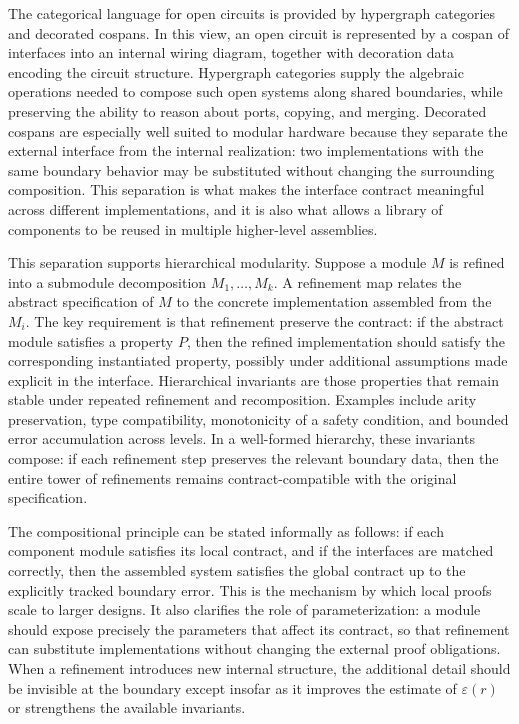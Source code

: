 \documentclass[11pt]{article}
\begin{document}
The categorical language for open circuits is provided by hypergraph categories and decorated cospans. In this view, an open circuit is represented by a cospan of interfaces into an internal wiring diagram, together with decoration data encoding the circuit structure. Hypergraph categories supply the algebraic operations needed to compose such open systems along shared boundaries, while preserving the ability to reason about ports, copying, and merging. Decorated cospans are especially well suited to modular hardware because they separate the external interface from the internal realization: two implementations with the same boundary behavior may be substituted without changing the surrounding composition. This separation is what makes the interface contract meaningful across different implementations, and it is also what allows a library of components to be reused in multiple higher-level assemblies.

This separation supports hierarchical modularity. Suppose a module \(M\) is refined into a submodule decomposition \(M_1,\dots,M_k\). A refinement map relates the abstract specification of \(M\) to the concrete implementation assembled from the \(M_i\). The key requirement is that refinement preserve the contract: if the abstract module satisfies a property \(P\), then the refined implementation should satisfy the corresponding instantiated property, possibly under additional assumptions made explicit in the interface. Hierarchical invariants are those properties that remain stable under repeated refinement and recomposition. Examples include arity preservation, type compatibility, monotonicity of a safety condition, and bounded error accumulation across levels. In a well-formed hierarchy, these invariants compose: if each refinement step preserves the relevant boundary data, then the entire tower of refinements remains contract-compatible with the original specification.

The compositional principle can be stated informally as follows: if each component module satisfies its local contract, and if the interfaces are matched correctly, then the assembled system satisfies the global contract up to the explicitly tracked boundary error. This is the mechanism by which local proofs scale to larger designs. It also clarifies the role of parameterization: a module should expose precisely the parameters that affect its contract, so that refinement can substitute implementations without changing the external proof obligations. When a refinement introduces new internal structure, the additional detail should be invisible at the boundary except insofar as it improves the estimate of \(\varepsilon(r)\) or strengthens the available invariants.
\end{document}
